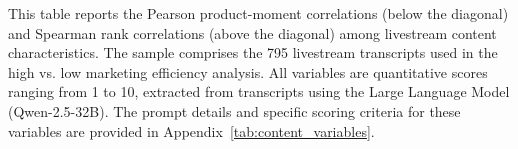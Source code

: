 \begin{landscape}

  \begin{table}[!ht]
    \caption{Correlations among Livestream Content Characteristics}\label{tab:correlations}
    \vspace{.2in}
    \footnotesize{This table reports the Pearson product-moment correlations (below the diagonal) and Spearman rank correlations (above the diagonal) among livestream content characteristics. The sample comprises the 795 livestream transcripts used in the high vs. low marketing efficiency analysis. All variables are quantitative scores ranging from 1 to 10, extracted from transcripts using the Large Language Model (Qwen-2.5-32B). The prompt details and specific scoring criteria for these variables are provided in Appendix~\ref{tab:content_variables}.}

    \vspace{.2in}
    \centering


\end{table}
\end{landscape}
